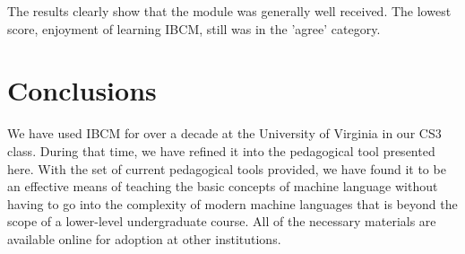 The results clearly show that the module was generally well received.
The lowest score, enjoyment of learning IBCM, still was in the 'agree'
category.

\section{Conclusions}

We have used IBCM for over a decade at the University of
Virginia in our CS3
class.  During that time, we have refined it into the pedagogical tool
presented here.  With the set of current pedagogical tools provided,
we have found it to be an effective means of teaching the basic
concepts of machine language without having to go into the complexity
of modern machine languages that is beyond the scope of a lower-level
undergraduate course.  All of the necessary materials are available
online for adoption at other institutions.
